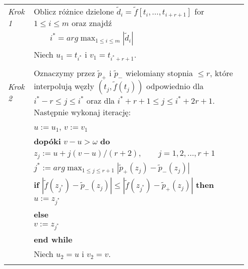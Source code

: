 \documentclass[oik, pdftex, robocza, man]{mgrwms}
\begin{document}
\noindent
\begin{tabular}{p{0.10\linewidth} p{0.85\linewidth}}
    
    \textit{Krok 1} & Oblicz różnice dzielone $\tilde{d}_i = \tilde{f}[t_i, \ldots, t_{i+r+1}]$ for $1 \leq i \leq m $ oraz znajdź \\
                    & \(\displaystyle \qquad i^* = arg \max_{1 \leq i \leq m }|\tilde{d}_i| \)  \\
                    & Niech $u_1 = t_{i^*}$ i $v_1 = t_{i^* + r + 1}$. \\
                    & \\

    \textit{Krok 2} & Oznaczymy przez $\tilde{p}_+$ i $\tilde{p}_-$ wielomiany stopnia $ \leq r$, które interpolują węzły $(t_j, \tilde{f}(t_j))$ odpowiednio dla $i^* - r \leq j \leq i^*$ oraz dla $i^* + r + 1 \leq j \leq i^* + 2r + 1$. Następnie wykonaj iterację: \\
                    & $u := u_1$, $v := v_1$ \\
                    & \textbf{dopóki} $v-u > \omega$ \textbf{do} \\
                    & \hspace{20pt}$z_j := u + j(v-u) / (r+2), \qquad j = 1, 2, \ldots, r + 1$ \\
                    & \hspace{20pt}\(\displaystyle j^* := arg \max_{1 \leq j \leq r + 1}|\tilde{p}_{+}(z_j) - \tilde{p}_{-}(z_j)| \) \\
                    & \hspace{20pt}\textbf{if} $|\tilde{f}(z_{j^*}) - \tilde{p}_{-}(z_j)| \leq |\tilde{f}(z_{j^*}) - \tilde{p}_{+}(z_j)|$ \textbf{then} \\
                    & \hspace{40pt}$u:= z_{j^*}$ \\
                    & \hspace{20pt}\textbf{else} \\
                    & \hspace{40pt}$v:= z_{j^*}$ \\
                    & \textbf{end while} \\
                    & Niech $u_2 = u$ i $v_2 = v$. \\
                    & \\


\end{tabular}
\end{document}
